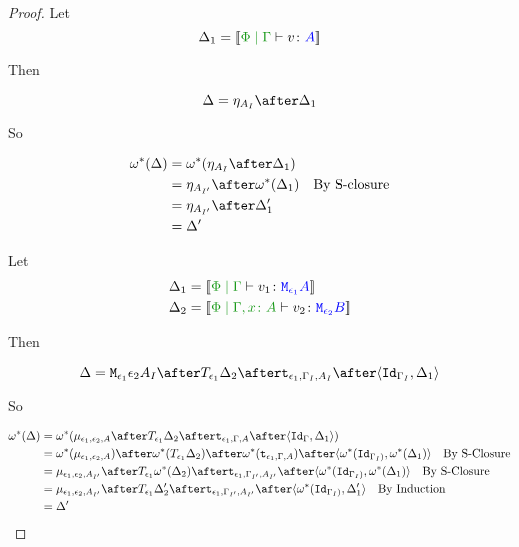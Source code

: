 \documentclass{report}
\begin{document}
\begin{framed}
\begin{proof}
        Let \begin{equation}
            \D_1 = \deno{\gpetyperelation{v}{A}}
        \end{equation}
        
        Then
        
        \begin{equation}
            \D = \point{A_I}\after \D_1\\
        \end{equation}
        
        So
        
        \begin{align*}
            \w\star(\D) &= \w\star(\point{A_I}\after \D_1)\\
                    & = \point{A_{I'}} \after\w\star(\D_1)\qt{By S-closure}\\
                    & = \point{A_{I'}} \after\D_1'\\
                    & = \D'
        \end{align*}
        
        Let \begin{align*}
            \D_1 &= \deno{\gpetyperelation{v_1}{\M{\e_1}{A}}}\\
            \D_2 &= \deno{\etyperelation{\P}{\gax}{v_2}{\M{\e_2}{B}}}
        \end{align*}
        
        Then
        
        \begin{equation}
            \D = \M{\e_1}{\e_2}{A_I}\after\T{\e_1}{\D_2}\after\tstrength{\e_1}{\G_I}{A_I}\after\pr{\Id{\G_{I}}}{\D_1}\\
        \end{equation}
        
        So
        
        \begin{align*}
            \w\star(\D) &= \w\star(\bind{\e_1}{\e_2}{A}\after\T{\e_1}{\D_2}\after\tstrength{\e_1}{\G}{A}\after\pr{\Id{\G}}{\D_1})\\
            & = \w\star(\bind{\e_1}{\e_2}{A})\after\w\star(\T{\e_1}{\D_2})\after\w\star(\tstrength{\e_1}{\G}{A})\after\pr{\w\star(\Id{\G_{I})}}{\w\star(\D_1)}\qt{By S-Closure}\\
            &= \bind{\e_1}{\e_2}{A_{I'}}\after\T{\e_1}{\w\star(\D_2)}\after\tstrength{\e_1}{\G_{I'}}{A_{I'}}\after\pr{\w\star(\Id{\G_{I})}}{\w\star(\D_1)}\qt{By S-Closure}\\
            &= \bind{\e_1}{\e_2}{A_{I'}}\after\T{\e_1}{\D_2'}\after\tstrength{\e_1}{\G_{I'}}{A_{I'}}\after\pr{\w\star(\Id{\G_{I})}}{\D_1'}\qt{By Induction}\\
            &= \D'\\
        \end{align*}
        

\end{proof}
\end{framed}
\end{document}
